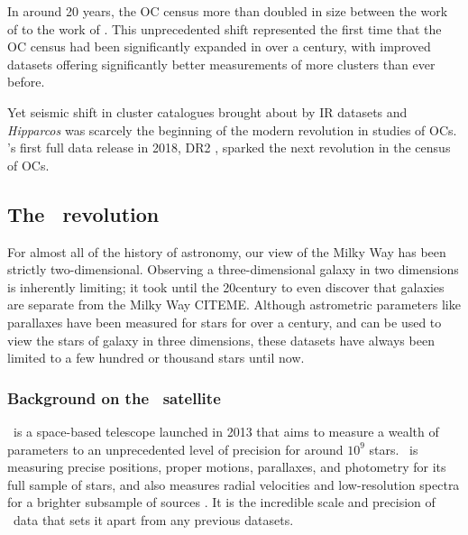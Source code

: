In around 20 years, the OC census more than doubled in size between the work of \cite{mermilliod_database_1995} to the work of \cite{kharchenko_global_2013}. This unprecedented shift represented the first time that the OC census had been significantly expanded in over a century, with improved datasets offering significantly better measurements of more clusters than ever before. 

Yet seismic shift in cluster catalogues brought about by IR datasets and \emph{Hipparcos} was scarcely the beginning of the modern revolution in studies of OCs. \gaia's first full data release in 2018, DR2 \citep{brown_gaia_2018}, sparked the next revolution in the census of OCs.

\subsection{The \gaia\ revolution}
\label{sec:intro:history:gaia}

For almost all of the history of astronomy, our view of the Milky Way has been strictly two-dimensional. Observing a three-dimensional galaxy in two dimensions is inherently limiting; it took until the 20\third century to even discover that galaxies are separate from the Milky Way CITEME. Although astrometric parameters like parallaxes have been measured for stars for over a century, and can be used to view the stars of galaxy in three dimensions, these datasets have always been limited to a few hundred or thousand stars until now. %

\subsubsection{Background on the \gaia\ satellite}
\label{sec:intro:history:gaia:background}

\gaia\ is a space-based telescope launched in 2013 that aims to measure a wealth of parameters to an unprecedented level of precision for around $10^9$ stars. \gaia\ is measuring precise positions, proper motions, parallaxes, and photometry for its full sample of stars, and also measures radial velocities and low-resolution spectra for a brighter subsample of sources \citep{gaia_collaboration_gaia_2016}. It is the incredible scale and precision of \gaia\ data that sets it apart from any previous datasets.


